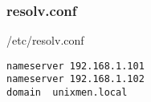 \begin{frame}[fragile]
  \frametitle{resolv.conf}
/etc/resolv.conf
\begin{lstlisting}
nameserver 192.168.1.101
nameserver 192.168.1.102
domain  unixmen.local
\end{lstlisting}

\end{frame}